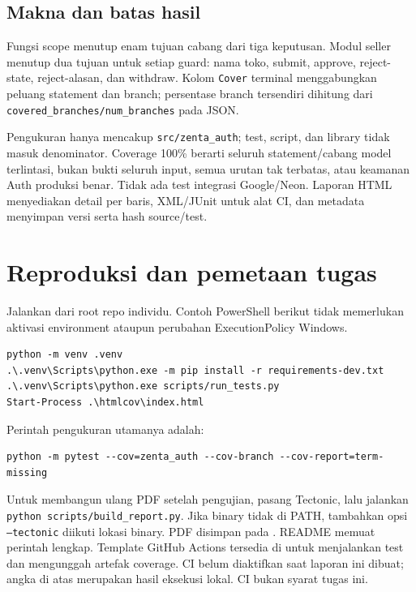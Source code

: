 \documentclass[11pt,a4paper]{article}
\begin{document}
\subsection{Makna dan batas hasil}
Fungsi scope menutup enam tujuan cabang dari tiga keputusan. Modul seller
menutup dua tujuan untuk setiap guard: nama toko, submit, approve,
reject-state, reject-alasan, dan withdraw. Kolom \texttt{Cover} terminal
menggabungkan peluang statement dan branch; persentase branch tersendiri
dihitung dari \texttt{covered\_branches/num\_branches} pada JSON.

Pengukuran hanya mencakup \texttt{src/zenta\_auth}; test, script, dan library
tidak masuk denominator. Coverage 100\% berarti seluruh statement/cabang
model terlintasi, bukan bukti seluruh input, semua urutan tak terbatas,
atau keamanan Auth produksi benar. Tidak ada test integrasi Google/Neon.
Laporan HTML menyediakan detail per baris, XML/JUnit untuk alat CI,
dan metadata menyimpan versi serta hash source/test.

\newpage
\section{Reproduksi dan pemetaan tugas}
Jalankan dari root repo individu. Contoh PowerShell berikut tidak memerlukan
aktivasi environment ataupun perubahan ExecutionPolicy Windows.
\begin{lstlisting}[language={}]
python -m venv .venv
.\.venv\Scripts\python.exe -m pip install -r requirements-dev.txt
.\.venv\Scripts\python.exe scripts/run_tests.py
Start-Process .\htmlcov\index.html
\end{lstlisting}
Perintah pengukuran utamanya adalah:
\begin{lstlisting}[language={}]
python -m pytest --cov=zenta_auth --cov-branch --cov-report=term-missing
\end{lstlisting}
Untuk membangun ulang PDF setelah pengujian, pasang Tectonic, lalu jalankan
\texttt{python scripts/build\_report.py}. Jika binary tidak di PATH,
tambahkan opsi \texttt{--tectonic} diikuti lokasi binary. PDF disimpan pada
. README memuat perintah lengkap.
Template GitHub Actions tersedia di  untuk menjalankan
test dan mengunggah artefak coverage. CI belum diaktifkan saat laporan ini
dibuat; angka di atas merupakan hasil eksekusi lokal. CI bukan syarat tugas ini.
\end{document}
